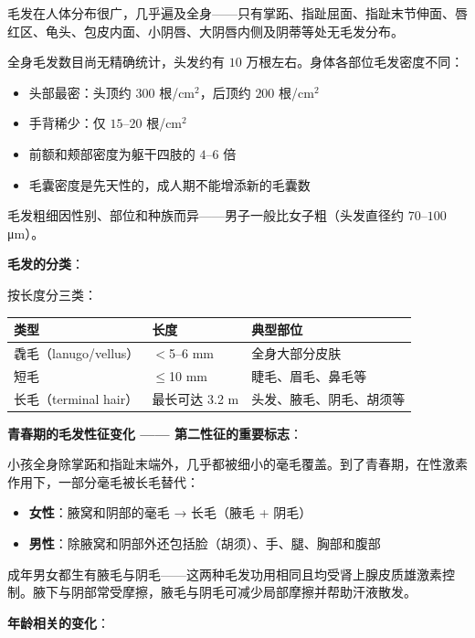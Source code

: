 \begin{enumerate}
毛发在人体分布很广，几乎遍及全身——只有掌跖、指趾屈面、指趾末节伸面、唇红区、龟头、包皮内面、小阴唇、大阴唇内侧及阴蒂等处无毛发分布。

全身毛发数目尚无精确统计，头发约有 $10$ 万根左右。身体各部位毛发密度不同：
\begin{itemize}
	\item 头部最密：头顶约 $300$ 根/cm$^2$，后顶约 $200$ 根/cm$^2$
	\item 手背稀少：仅 $15$--$20$ 根/cm$^2$
	\item 前额和颊部密度为躯干四肢的 $4$--$6$ 倍
	\item 毛囊密度是先天性的，成人期不能增添新的毛囊数
\end{itemize}

毛发粗细因性别、部位和种族而异——男子一般比女子粗（头发直径约 $70$--$100$ μm）。

\vspace{0.5em}
\noindent\textbf{毛发的分类}：

按长度分三类：
\begin{center}\small
\begin{tabular}{|l|l|p{6cm}|}
\hline
类型 & 长度 & 典型部位 \\
\hline
毳毛（lanugo/vellus） & $<$5--6 mm & 全身大部分皮肤 \\
短毛 & $\leq$10 mm & 睫毛、眉毛、鼻毛等 \\
长毛（terminal hair）& 最长可达 3.2 m & 头发、腋毛、阴毛、胡须等 \\
\hline
\end{tabular}
\end{center}

\vspace{0.5em}
\noindent\textbf{青春期的毛发性征变化 —— 第二性征的重要标志}：

小孩全身除掌跖和指趾末端外，几乎都被细小的毫毛覆盖。到了青春期，在性激素作用下，一部分毫毛被长毛替代：
\begin{itemize}
	\item \textbf{女性}：腋窝和阴部的毫毛 → 长毛（腋毛 + 阴毛）
	\item \textbf{男性}：除腋窝和阴部外还包括脸（胡须）、手、腿、胸部和腹部
\end{itemize}

成年男女都生有腋毛与阴毛——这两种毛发功用相同且均受肾上腺皮质雄激素控制。腋下与阴部常受摩擦，腋毛与阴毛可减少局部摩擦并帮助汗液散发。

\vspace{0.5em}
\noindent\textbf{年龄相关的变化}：


\end{enumerate}
